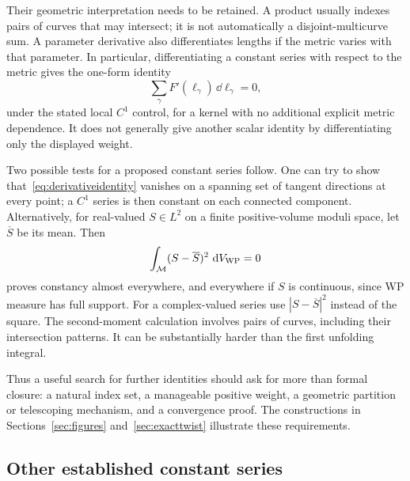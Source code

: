 Their geometric interpretation needs to be retained. A product usually
indexes pairs of curves that may intersect; it is not automatically a
disjoint-multicurve sum. A parameter derivative also differentiates lengths
if the metric varies with that parameter. In particular, differentiating
a constant series with respect to the metric gives the one-form identity
\begin{equation}
 \sum_\gamma F'(\ell_\gamma)\,\dd\ell_\gamma=0,
 \label{eq:derivativeidentity}
\end{equation}
under the stated local $C^1$ control, for a kernel with no additional
explicit metric dependence. It does not generally give
another scalar identity by differentiating only the displayed weight.

Two possible tests for a proposed constant series follow. One can try to
show that~\eqref{eq:derivativeidentity} vanishes on a spanning set of tangent
directions at every point; a $C^1$ series is then constant on each
connected component. Alternatively, for real-valued $S\in L^2$ on a
finite positive-volume moduli space, let $\overline S$ be its mean. Then
\begin{equation}
 \int_{\mathcal M}(S-\overline S)^2\,\mathop{}\!\mathrm d V_{\mathrm{WP}}=0
 \label{eq:variance}
\end{equation}
proves constancy almost everywhere, and everywhere if $S$ is continuous,
since WP measure has full support. For a complex-valued series use
$|S-\overline S|^2$ instead of the square.
The second-moment calculation involves pairs of curves, including their
intersection patterns. It can be substantially harder than the first
unfolding integral.

Thus a useful search for further identities should ask for more than
formal closure: a natural index set, a manageable positive weight, a
geometric partition or telescoping mechanism, and a convergence proof.
The constructions in Sections~\ref{sec:figures} and~\ref{sec:exacttwist}
illustrate these requirements.

\subsection{Other established constant series}

